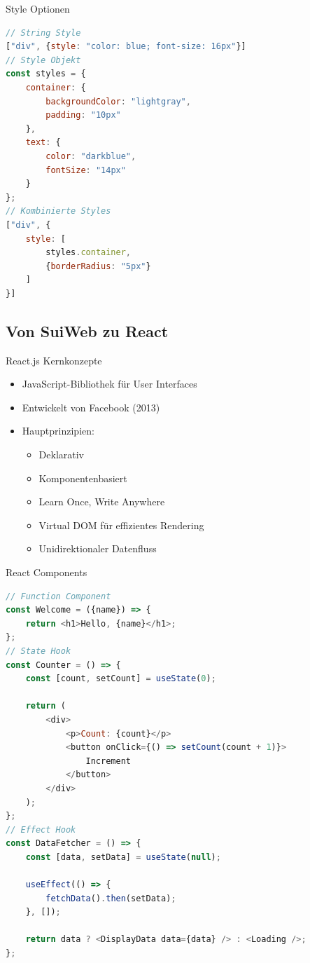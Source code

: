 \begin{KR}{Style Optionen}
\begin{lstlisting}[language=JavaScript, style=basesmol]
// String Style
["div", {style: "color: blue; font-size: 16px"}]
// Style Objekt
const styles = {
    container: {
        backgroundColor: "lightgray",
        padding: "10px"
    },
    text: {
        color: "darkblue",
        fontSize: "14px"
    }
};
// Kombinierte Styles
["div", {
    style: [
        styles.container,
        {borderRadius: "5px"}
    ]
}]
\end{lstlisting}
\end{KR}

\subsection{Von SuiWeb zu React}

\begin{concept}{React.js Kernkonzepte}
    \begin{itemize}
        \item JavaScript-Bibliothek für User Interfaces
        \item Entwickelt von Facebook (2013)
        \item Hauptprinzipien:
            \begin{itemize}
                \item Deklarativ
                \item Komponentenbasiert
                \item Learn Once, Write Anywhere
                \item Virtual DOM für effizientes Rendering
                \item Unidirektionaler Datenfluss
            \end{itemize}
    \end{itemize}
\end{concept}

\begin{KR}{React Components}
\begin{lstlisting}[language=JavaScript, style=basesmol]
// Function Component
const Welcome = ({name}) => {
    return <h1>Hello, {name}</h1>;
};
// State Hook
const Counter = () => {
    const [count, setCount] = useState(0);
    
    return (
        <div>
            <p>Count: {count}</p>
            <button onClick={() => setCount(count + 1)}>
                Increment
            </button>
        </div>
    );
};
// Effect Hook
const DataFetcher = () => {
    const [data, setData] = useState(null);
    
    useEffect(() => {
        fetchData().then(setData);
    }, []);
    
    return data ? <DisplayData data={data} /> : <Loading />;
};
\end{lstlisting}
\end{KR}

